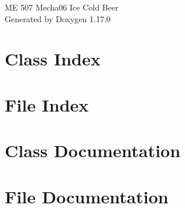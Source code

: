 \documentclass[twoside]{book}
\newcommand{\+}{\discretionary{\mbox{\scriptsize$\hookleftarrow$}}{}{}}
\newcommand{\clearemptydoublepage}{%
    \newpage{\pagestyle{empty}\cleardoublepage}%
  }
\begin{document}
  \raggedbottom
    \hypersetup{pageanchor=false,
                bookmarksnumbered=true,
                pdfencoding=unicode
               }
  \begin{titlepage}
  \vspace*{7cm}
  \begin{center}%
  {\Large ME 507 Mecha06 Ice Cold Beer}\\
  \vspace*{1cm}
  {\large Generated by Doxygen 1.17.0}\\
  \end{center}
  \end{titlepage}
  \clearemptydoublepage
  \tableofcontents
  \clearemptydoublepage
  \hypersetup{pageanchor=true}
\chapter{Class Index}

\chapter{File Index}

\chapter{Class Documentation}

\chapter{File Documentation}






  \backmatter
  \newpage
  \clearemptydoublepage
  \printindex
\end{document}
